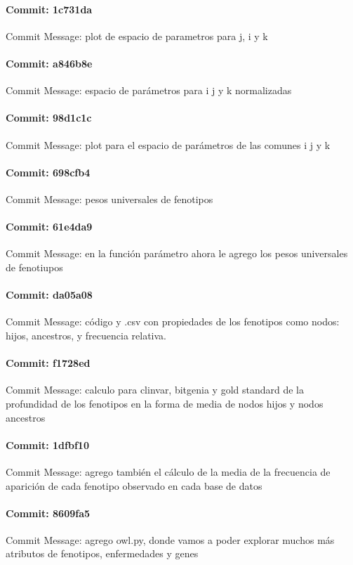 \documentclass{article}
\begin{document}
\paragraph{Commit: 1c731da}
Commit Message: plot de espacio de parametros para j, i y k

\paragraph{Commit: a846b8e}
Commit Message: espacio de parámetros para i j y k normalizadas

\paragraph{Commit: 98d1c1c}
Commit Message: plot para el espacio de parámetros de las comunes i j y k

\paragraph{Commit: 698cfb4}
Commit Message: pesos universales de fenotipos

\paragraph{Commit: 61e4da9}
Commit Message: en la función parámetro ahora le agrego los pesos universales de fenotiupos

\paragraph{Commit: da05a08}
Commit Message: código y .csv con propiedades de los fenotipos como nodos: hijos, ancestros, y frecuencia relativa.

\paragraph{Commit: f1728ed}
Commit Message: calculo para clinvar, bitgenia y gold standard de la profundidad de los fenotipos en la forma de media de nodos hijos y nodos ancestros

\paragraph{Commit: 1dfbf10}
Commit Message: agrego también el cálculo de la media de la frecuencia de aparición de cada fenotipo observado en cada base de datos

\paragraph{Commit: 8609fa5}
Commit Message: agrego owl.py, donde vamos a poder explorar muchos más atributos de fenotipos, enfermedades y genes
\end{document}
